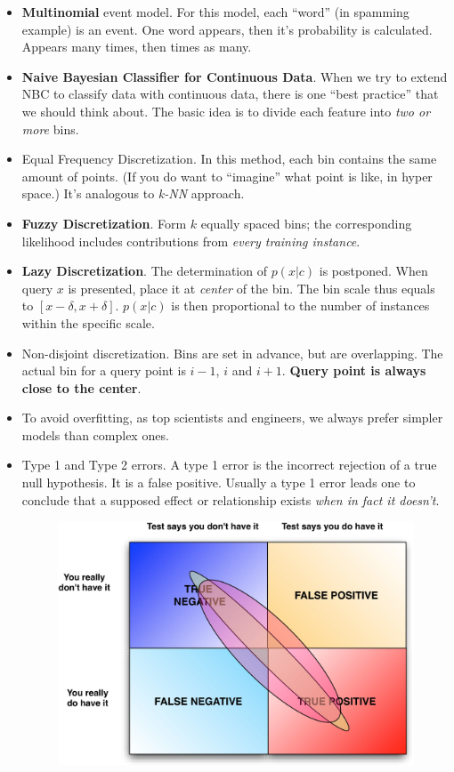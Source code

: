 \documentclass[twocolumn]{article}
\begin{document}
\begin{itemize}
\item \textbf{Multinomial} event model. For this model, each ``word''
  (in spamming example) is an event. One word appears, then it's
  probability is calculated. Appears many times, then times as many.
\item \textbf{Naive Bayesian Classifier for Continuous Data}. When we
  try to extend NBC to classify data with continuous data, there is
  one ``best practice'' that we should think about. The basic idea is
  to divide each feature into \emph{two or more} bins. 
\item Equal Frequency Discretization. In this method, each bin
  contains the same amount of points. (If you do want to ``imagine''
  what point is like, in hyper space.) It's analogous to \emph{k-NN}
  approach. 
\item \textbf{Fuzzy Discretization}. Form $k$ equally spaced bins; the
  corresponding likelihood includes contributions from \emph{every
    training instance}.
\item \textbf{Lazy Discretization}. The determination of $p(x|c)$ is
  postponed. When query $x$ is presented, place it at \emph{center} of
  the bin. The bin scale thus equals to
  $[x-\delta,x+\delta]$. $p(x|c)$ is then proportional to the number
  of instances within the specific scale. 
\item Non-disjoint discretization. Bins are set in advance, but are
  overlapping. The actual bin for a query point is $i-1$, $i$ and
  $i+1$. \textbf{Query point is always close to the center}.
\item To avoid overfitting, as top scientists and engineers, we always
  prefer simpler models than complex ones.
\item Type 1 and Type 2 errors. A type 1 error is the incorrect
  rejection of a true null hypothesis. It is a false positive. Usually
  a type 1 error leads one to conclude that a supposed effect or
  relationship exists \emph{when in fact it doesn't}.
  \begin{figure}[htbp]
    \centering
    \includegraphics[scale=0.5]{falsetrue}

\end{figure}
\end{itemize}
\end{document}
